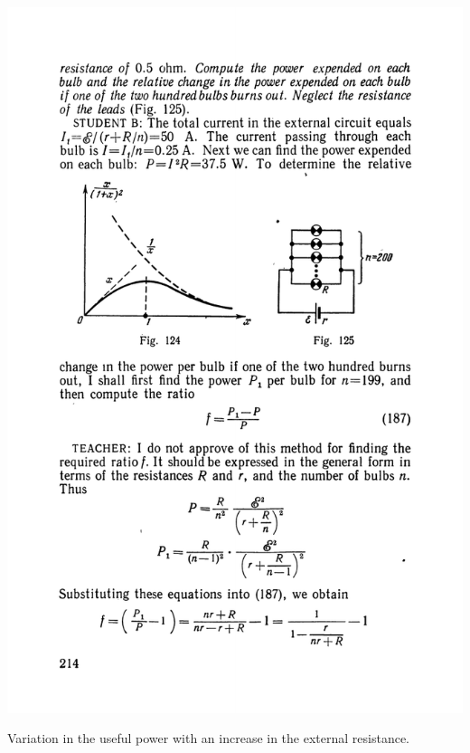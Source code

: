 \documentclass[a4paper,sfsidenotes]{tufte-book}
\begin{document}
\begin{marginfigure}%
\centering
\includegraphics[width=\linewidth]{fig-124a}
\caption{Variation in the useful power with an increase in the external resistance.}
\label{fig-124}
\end{marginfigure}
\end{document}
